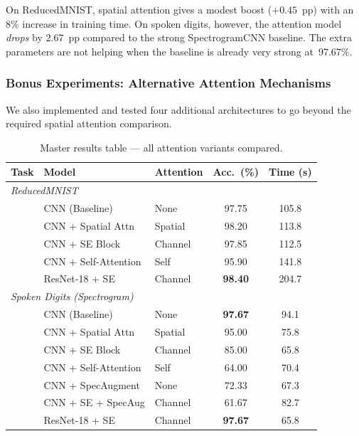 \documentclass[12pt, a4paper]{article}
\renewcommand{\arraystretch}{1.12}
\begin{document}
On ReducedMNIST, spatial attention gives a modest boost ($+0.45$~pp) with an
8\% increase in training time.  On spoken digits, however, the attention model
\emph{drops} by 2.67~pp compared to the strong SpectrogramCNN baseline.
The extra parameters are not helping when the baseline is already very strong
at~97.67\%.

\subsubsection{Bonus Experiments: Alternative Attention Mechanisms}

We also implemented and tested four additional architectures to go beyond the
required spatial attention comparison.

\begin{table}[H]
\centering
\renewcommand{\arraystretch}{1.3}
\begin{tabular}{l l l c c}
\toprule
\textbf{Task} & \textbf{Model} & \textbf{Attention} & \textbf{Acc.\ (\%)} & \textbf{Time (s)} \\
\midrule
\multicolumn{5}{l}{\textit{ReducedMNIST}} \\
 & CNN (Baseline)       & None    & 97.75 & 105.8 \\
 & CNN + Spatial Attn   & Spatial & 98.20 & 113.8 \\
 & CNN + SE Block       & Channel & 97.85 & 112.5 \\
 & CNN + Self-Attention & Self    & 95.90 & 141.8 \\
 & ResNet-18 + SE       & Channel & \textbf{98.40} & 204.7 \\
\midrule
\multicolumn{5}{l}{\textit{Spoken Digits (Spectrogram)}} \\
 & CNN (Baseline)       & None    & \textbf{97.67} & 94.1 \\
 & CNN + Spatial Attn   & Spatial & 95.00 & 75.8 \\
 & CNN + SE Block       & Channel & 85.00 & 65.8 \\
 & CNN + Self-Attention & Self    & 64.00 & 70.4 \\
 & CNN + SpecAugment    & None    & 72.33 & 67.3 \\
 & CNN + SE + SpecAug   & Channel & 61.67 & 82.7 \\
 & ResNet-18 + SE       & Channel & \textbf{97.67} & 65.8 \\
\bottomrule
\end{tabular}
\caption{Master results table --- all attention variants compared.}
\label{tab:p3_master}
\end{table}
\end{document}
